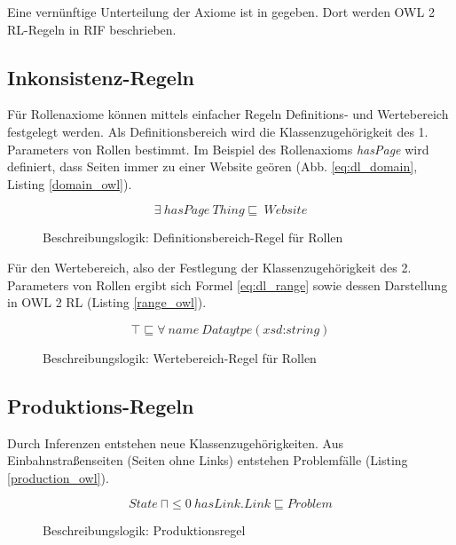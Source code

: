 \documentclass[runningheads,a4paper]{llncs}
\begin{document}
Eine vernünftige Unterteilung der Axiome ist in \cite{web_primer}   gegeben. 
Dort werden OWL 2 RL-Regeln in RIF \cite{owl2rif} beschrieben.


\subsection{Inkonsistenz-Regeln}
\label{sec:rule_inconsistency}

Für Rollenaxiome können mittels einfacher Regeln Definitions- und Wertebereich festgelegt werden. 
Als Definitionsbereich wird die Klassenzugehörigkeit des 1. Parameters von Rollen bestimmt.
Im Beispiel des Rollenaxioms \textit{hasPage} wird definiert, dass Seiten immer zu einer Website geören (Abb. \ref{eq:dl_domain}, Listing \ref{domain_owl}).

\begin{figure}
\begin{equation}
\exists\ hasPage\ Thing \sqsubseteq\ Website
\label{eq:dl_domain}
\end{equation}
\caption{Beschreibungslogik: Definitionsbereich-Regel für Rollen}
\end{figure}



Für den Wertebereich, also der Festlegung der Klassenzugehörigkeit des 2. Parameters von Rollen ergibt sich Formel \ref{eq:dl_range} sowie dessen Darstellung in OWL 2 RL (Listing \ref{range_owl}).

\begin{figure}
\begin{equation}
\top \sqsubseteq \forall\ name\ Dataytpe(\textit{xsd:string})
\label{eq:dl_range}
\end{equation}
\caption{Beschreibungslogik: Wertebereich-Regel für Rollen}
\end{figure}



\subsection{Produktions-Regeln}
\label{sec:rule_production}

Durch Inferenzen entstehen neue Klassenzugehörigkeiten. 
Aus Einbahnstraßenseiten (Seiten ohne Links) entstehen Problemfälle (Listing \ref{production_owl}). 
\begin{figure}
\begin{equation}
State\ \sqcap \leq 0\ hasLink.Link \sqsubseteq Problem
\label{eq:dl_infered}
\end{equation}
\caption{Beschreibungslogik: Produktionsregel}
\end{figure}
\end{document}
